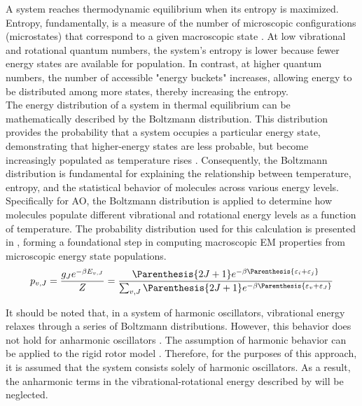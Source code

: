 A system reaches thermodynamic equilibrium when its entropy is maximized.
Entropy, fundamentally, is a measure of the number of microscopic
configurations (microstates) that correspond to a given macroscopic state
\cite{Reichl2016}. At low vibrational and rotational quantum numbers, the
system's entropy is lower because fewer energy states are available for
population. In contrast, at higher quantum numbers, the number of accessible
"energy buckets" increases, allowing energy to be distributed among more
states, thereby increasing the entropy.\\

    The energy distribution of a system in thermal equilibrium can be
    mathematically described by the Boltzmann distribution. This distribution
    provides the probability that a system occupies a particular energy state,
    demonstrating that higher-energy states are less probable, but become
    increasingly populated as temperature rises \cite{Callen1991}.
    Consequently, the Boltzmann distribution is fundamental for explaining the
    relationship between temperature, entropy, and the statistical behavior of
    molecules across various energy levels. \\

Specifically for \gls{AO}, the Boltzmann distribution is applied to determine
how molecules populate different vibrational and rotational energy levels as a
function of temperature. The probability distribution used for this calculation
is presented in , forming a foundational step in
computing macroscopic \gls{EM} properties from microscopic energy state
populations.
    \begin{equation}\label{eq:boltzmannDistribution}
        p_{v,J} = \frac{g_Je^{-\beta E_{v,J}}}{Z} = \frac{\Parenthesis{2J +
        1}e^{-\beta\Parenthesis{\varepsilon_i +
        \varepsilon_j}}}{\sum_{v,J}\Parenthesis{2J +
        1}e^{-\beta\Parenthesis{\varepsilon_v +\varepsilon_J}}}
    \end{equation}
 
    It should be noted that, in a system of harmonic oscillators, vibrational
    energy relaxes through a series of Boltzmann distributions. However, this
    behavior does not hold for anharmonic oscillators \cite{Anketell1974}. The
    assumption of harmonic behavior can be applied to the rigid rotor model
    \cite{Ott2000}. Therefore, for the purposes of this approach, it is assumed
    that the system consists solely of harmonic oscillators. As a result, the
    anharmonic terms in the vibrational-rotational energy described by
     will be neglected. \\ 

